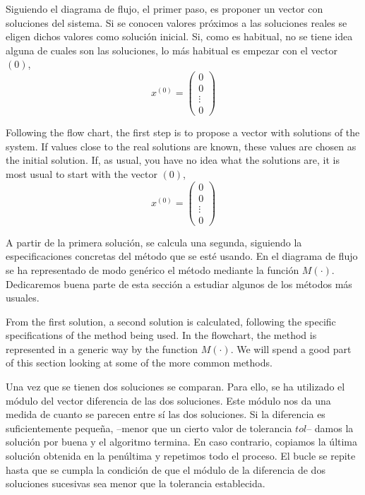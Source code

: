 \begin{paracol}{2}
Siguiendo el diagrama de flujo, el primer paso, es proponer un vector con soluciones del sistema. Si se conocen valores próximos a las soluciones reales se eligen dichos valores como solución inicial. Si, como es habitual, no se tiene idea alguna de cuales son las soluciones, lo más habitual es empezar con el vector $(0)$,
\begin{equation*}
x^{(0)}=\begin{pmatrix}
0\\
0\\
\vdots \\
0
\end{pmatrix}
\end{equation*}

    \switchcolumn
Following the flow chart, the first step is to propose a vector with solutions of the system. If values close to the real solutions are known, these values are chosen as the initial solution. If, as usual, you have no idea what the solutions are, it is most usual to start with the vector $(0)$,    
\begin{equation*}
x^{(0)}=\begin{pmatrix}
0\\
0\\
\vdots \\
0
\end{pmatrix}
\end{equation*}

\switchcolumn
A partir de la primera solución, se calcula una segunda, siguiendo la especificaciones concretas del método que se esté usando. En el diagrama de flujo se ha representado de modo genérico el método mediante la función $M(\cdot)$. Dedicaremos buena parte de esta sección a estudiar algunos de los métodos más usuales.

\switchcolumn
From the first solution, a second solution is calculated, following the specific specifications of the method being used. In the flowchart, the method is represented in a generic way by the function $M(\cdot)$. We will spend a good part of this section looking at some of the more common methods.

\switchcolumn
Una vez que se tienen dos soluciones se comparan. Para ello, se ha utilizado el módulo del vector diferencia de las dos soluciones. Este módulo nos da una medida de cuanto se parecen entre sí las dos soluciones. Si la diferencia es suficientemente pequeña, --menor que un cierto valor de tolerancia $tol$-- damos la solución por buena y el algoritmo termina. En caso contrario, copiamos la última solución obtenida en la penúltima y repetimos todo el proceso. El bucle se repite hasta que se cumpla la condición de que el módulo de la diferencia de dos soluciones sucesivas sea menor que la tolerancia establecida.


\end{paracol}

